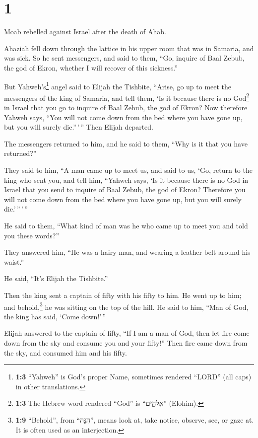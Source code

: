\hypertarget{section}{%
\section{1}\label{section}}

 Moab rebelled against Israel after the death of Ahab.

 Ahaziah fell down through the lattice in his upper room
that was in Samaria, and was sick. So he sent messengers, and said to
them, ``Go, inquire of Baal Zebub, the god of Ekron, whether I will
recover of this sickness.''

 But Yahweh's\footnote{\textbf{1:3} ``Yahweh'' is God's
  proper Name, sometimes rendered ``LORD'' (all caps) in other
  translations.} angel said to Elijah the Tishbite, ``Arise, go up to
meet the messengers of the king of Samaria, and tell them, `Is it
because there is no God\footnote{\textbf{1:3} The Hebrew word rendered
  ``God'' is ``אֱלֹהִ֑ים'' (Elohim).} in Israel that you go to inquire
of Baal Zebub, the god of Ekron?  Now therefore Yahweh
says, ``You will not come down from the bed where you have gone up, but
you will surely die.''\,'\,'' Then Elijah departed.

 The messengers returned to him, and he said to them,
``Why is it that you have returned?''

 They said to him, ``A man came up to meet us, and said to
us, `Go, return to the king who sent you, and tell him, ``Yahweh says,
`Is it because there is no God in Israel that you send to inquire of
Baal Zebub, the god of Ekron? Therefore you will not come down from the
bed where you have gone up, but you will surely die.'\,''\,'\,''

 He said to them, ``What kind of man was he who came up to
meet you and told you these words?''

 They answered him, ``He was a hairy man, and wearing a
leather belt around his waist.''

He said, ``It's Elijah the Tishbite.''

 Then the king sent a captain of fifty with his fifty to
him. He went up to him; and behold,\footnote{\textbf{1:9} ``Behold'',
  from ``הִנֵּה'', means look at, take notice, observe, see, or gaze at.
  It is often used as an interjection.} he was sitting on the top of the
hill. He said to him, ``Man of God, the king has said, `Come down!'\,''

 Elijah answered to the captain of fifty, ``If I am a man
of God, then let fire come down from the sky and consume you and your
fifty!'' Then fire came down from the sky, and consumed him and his
fifty.

